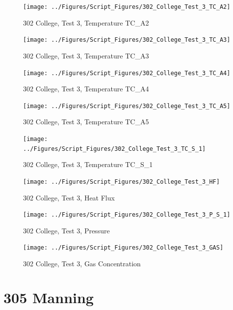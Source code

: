 \documentclass[12pt,oneside]{book}
\begin{document}
\begin{figure}[!ht]
\texttt{[image: ../Figures/Script\_Figures/302\_College\_Test\_3\_TC\_A2]}
\caption{302 College, Test 3, Temperature TC\_A2}
\label{fig:302_College_Test_3_TC_A2}
\end{figure}

\begin{figure}[!ht]
\texttt{[image: ../Figures/Script\_Figures/302\_College\_Test\_3\_TC\_A3]}
\caption{302 College, Test 3, Temperature TC\_A3}
\label{fig:302_College_Test_3_TC_A3}
\end{figure}

\begin{figure}[!ht]
\texttt{[image: ../Figures/Script\_Figures/302\_College\_Test\_3\_TC\_A4]}
\caption{302 College, Test 3, Temperature TC\_A4}
\label{fig:302_College_Test_3_TC_A4}
\end{figure}

\begin{figure}[!ht]
\texttt{[image: ../Figures/Script\_Figures/302\_College\_Test\_3\_TC\_A5]}
\caption{302 College, Test 3, Temperature TC\_A5}
\label{fig:302_College_Test_3_TC_A5}
\end{figure}

\begin{figure}[!ht]
\texttt{[image: ../Figures/Script\_Figures/302\_College\_Test\_3\_TC\_S\_1]}
\caption{302 College, Test 3, Temperature TC\_S\_1}
\label{fig:302_College_Test_3_TC_S_1}
\end{figure}

\begin{figure}[!ht]
\texttt{[image: ../Figures/Script\_Figures/302\_College\_Test\_3\_HF]}
\caption{302 College, Test 3, Heat Flux}
\label{fig:302_College_Test_3_HF}
\end{figure}

\begin{figure}[!ht]
\texttt{[image: ../Figures/Script\_Figures/302\_College\_Test\_3\_P\_S\_1]}
\caption{302 College, Test 3, Pressure}
\label{fig:302_College_Test_3_P_S_1}
\end{figure}

\begin{figure}[!ht]
\texttt{[image: ../Figures/Script\_Figures/302\_College\_Test\_3\_GAS]}
\caption{302 College, Test 3, Gas Concentration}
\label{fig:302_College_Test_3_GAS}
\end{figure}


\clearpage


\section{305 Manning}
\end{document}
